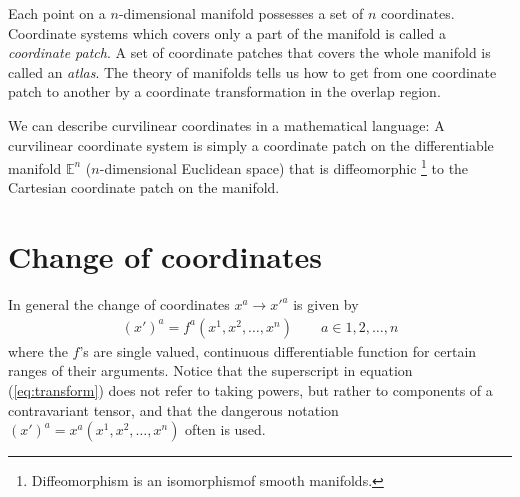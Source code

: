 \documentclass[a4paper, 12pt]{article}
\begin{document}
Each point on a $n$-dimensional manifold possesses a set of 
$n$ coordinates. Coordinate systems which covers only a part of the manifold is 
called a \emph{coordinate patch}. A set of coordinate patches that covers the 
whole manifold is called an \emph{atlas}. The theory of manifolds tells us how 
to get from one coordinate patch to another by a coordinate transformation in 
the overlap region. 

We can describe curvilinear coordinates in a mathematical language: A 
curvilinear coordinate system is simply a coordinate patch on the differentiable 
manifold $\mathbb{E}^n$ ($n$-dimensional Euclidean space) that is diffeomorphic 
%
\footnote{Diffeomorphism is an isomorphism\footnotemark of smooth manifolds.}%
%
%
%
%
to the Cartesian coordinate patch on the manifold.







\section{Change of coordinates} \label{sec:change_of_coordinates}
In general the change of coordinates $x^a \to x'^a$ is given by
%
\begin{align}
 (x')^a = f^a(x^1,x^2,\ldots,x^n)\qquad a\in{1,2,\ldots,n} \label{eq:transform}
\end{align}
%
where the $f$'s are single valued, continuous differentiable function for 
certain ranges of their arguments. Notice that the superscript in equation 
(\ref{eq:transform}) does not refer to taking powers, but rather to components 
of a contravariant tensor, and that the dangerous notation $(x')^a = 
x^a(x^1,x^2,\ldots,x^n)$ often is used.
\end{document}
